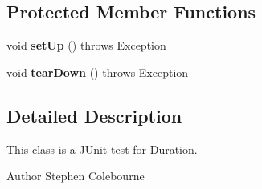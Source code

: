 \subsection*{Protected Member Functions}
\begin{DoxyCompactItemize}
\item 
\hypertarget{classorg_1_1joda_1_1time_1_1_test_period___constructors_a3ca2cd21436998b5f885b2e8aece7529}{void {\bfseries set\-Up} ()  throws Exception }\label{classorg_1_1joda_1_1time_1_1_test_period___constructors_a3ca2cd21436998b5f885b2e8aece7529}

\item 
\hypertarget{classorg_1_1joda_1_1time_1_1_test_period___constructors_adb33d75b2fea7830499a7ad997487be9}{void {\bfseries tear\-Down} ()  throws Exception }\label{classorg_1_1joda_1_1time_1_1_test_period___constructors_adb33d75b2fea7830499a7ad997487be9}

\end{DoxyCompactItemize}


\subsection{Detailed Description}
This class is a J\-Unit test for \hyperlink{classorg_1_1joda_1_1time_1_1_duration}{Duration}.

\begin{DoxyAuthor}{Author}
Stephen Colebourne 
\end{DoxyAuthor}


